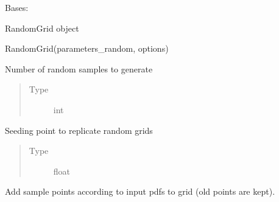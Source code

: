 \documentclass[letterpaper,10pt,english,openany,oneside]{sphinxmanual}
\begin{document}
\begin{fulllineitems}
\label{\detokenize{pygpc:pygpc.Grid.RandomGrid}}
Bases: {\hyperref[\detokenize{pygpc:pygpc.Grid.Grid}]{}}

RandomGrid object

RandomGrid(parameters\_random, options)

\begin{fulllineitems}
\label{\detokenize{pygpc:pygpc.Grid.RandomGrid.n_grid}}
Number of random samples to generate
\begin{quote}\begin{description}
\item[{Type}] \leavevmode
int

\end{description}\end{quote}

\end{fulllineitems}


\begin{fulllineitems}
\label{\detokenize{pygpc:pygpc.Grid.RandomGrid.seed}}
Seeding point to replicate random grids
\begin{quote}\begin{description}
\item[{Type}] \leavevmode
float

\end{description}\end{quote}

\end{fulllineitems}


\begin{fulllineitems}
\label{\detokenize{pygpc:pygpc.Grid.RandomGrid.extend_random_grid}}
Add sample points according to input pdfs to grid (old points are kept).


\end{fulllineitems}
\end{fulllineitems}
\end{document}
